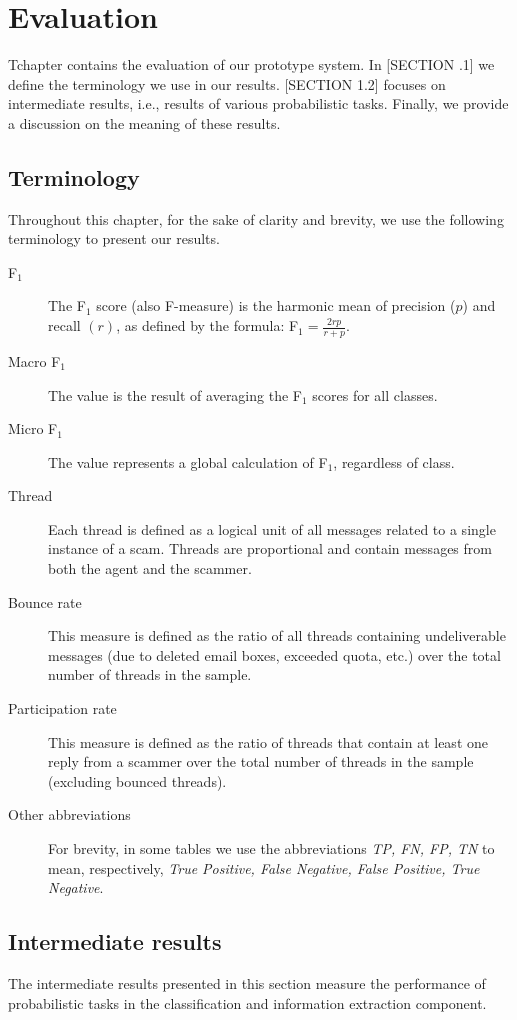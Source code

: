 \chapter{Evaluation}
T\his chapter contains the evaluation of our prototype system. In [SECTION .1] we define the terminology we use in our results. [SECTION 1.2] focuses on intermediate results, i.e., results of various probabilistic tasks. Finally, we provide a discussion on the meaning of these results.

\section{Terminology}
Throughout this chapter, for the sake of clarity and brevity, we use the following terminology to present our results.
\begin{description}
\item[F$_{1}$] The F$_{1}$ score (also F-measure) is the harmonic mean of precision ($p$) and recall $(r)$, as defined by the formula: F$_{1} = \frac{2rp}{r + p}$.
\item[Macro F$_{1}$] The value is the result of averaging the F$_{1}$ scores for all classes.
\item[Micro F$_{1}$] The value represents a global calculation of F$_{1}$, regardless of class.
\item[Thread] Each thread is defined as a logical unit of all messages related to a single instance of a scam. Threads are proportional and contain messages from both the agent and the scammer.
\item[Bounce rate] This measure is defined as the ratio of all threads containing undeliverable messages (due to deleted email boxes, exceeded quota, etc.) over the total number of threads in the sample.
\item[Participation rate] This measure is defined as the ratio of threads that contain at least one reply from a scammer over the total number of threads in the sample (excluding bounced threads).
\item[Other abbreviations] For brevity, in some tables we use the abbreviations \textit{TP, FN, FP, TN} to mean, respectively, \textit{True Positive, False Negative, False Positive, True Negative}.
\end{description}

\section{Intermediate results}
The intermediate results presented in this section measure the performance of probabilistic tasks in the classification and information extraction component.


